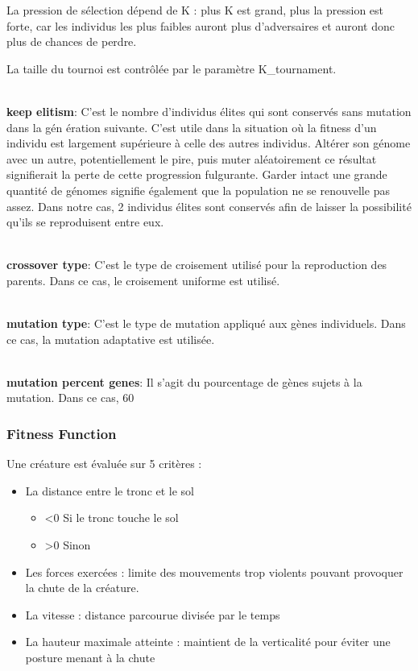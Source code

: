 \documentclass[journal, a4paper]{IEEEtran}
\begin{document}
	La pression de sélection dépend de K : plus K est grand,
	plus la pression est forte, car les individus les plus faibles
	auront plus d'adversaires et auront donc plus de chances de perdre.

    La taille du tournoi est contrôlée par le paramètre K\_tournament.

    \\ \textbf{keep elitism}: C'est le nombre d'individus élites
	qui sont conservés sans mutation dans la gén
	ération suivante. C'est utile dans la situation où la fitness d'un
	individu est largement supérieure à celle des autres individus.
	Altérer son génome avec un autre, potentiellement le pire, puis
	muter aléatoirement ce résultat signifierait la perte de cette
	progression fulgurante. Garder intact une grande quantité de
	génomes
	signifie également que la population ne se renouvelle pas assez.
	Dans notre cas, 2 individus
	élites sont conservés afin de laisser la possibilité qu'ils se
	reproduisent entre eux.


    \\ \textbf{crossover type}: C'est le type de croisement utilisé
	pour la reproduction des parents. Dans ce cas, le croisement uniforme est utilisé.

    \\ \textbf{mutation type}: C'est le type de mutation appliqué aux
	gènes individuels. Dans ce cas, la mutation adaptative est utilisée.

    \\ \textbf{mutation percent genes}: Il s'agit du pourcentage de
	gènes sujets à la mutation. Dans ce cas, 60 %


	\subsubsection{Fitness Function}
		Une créature est évaluée sur 5 critères :
		\begin{itemize}
			\item La distance entre le tronc et le sol 
			\begin{itemize}
				\item <0 Si le tronc touche le sol
				\item >0 Sinon
			\end{itemize}
			\item Les forces exercées : limite des mouvements
			trop violents pouvant provoquer la chute de la créature.
			\item La vitesse : distance parcourue divisée par le temps
			\item La hauteur maximale atteinte : maintient de la verticalité
			pour éviter une posture menant à la chute
		\end{itemize}
\end{document}
